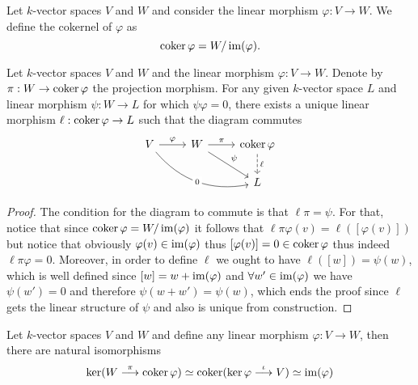 \begin{definition}[Cokernel]
    Let \(k\)-vector spaces \(V\) and \(W\) and consider the linear morphism
    \(\varphi : V \to W\). We define the cokernel of \(\varphi\) as
    \[
        \operatorname{coker} \varphi = W/\operatorname{im}(\varphi).
    \]
\end{definition}

\begin{theorem}
    Let \(k\)-vector spaces \(V\) and \(W\) and the linear morphism \(\varphi : V
    \to W\). Denote by \(\pi : W \to \operatorname{coker} \varphi\) the projection morphism.
    For any given \(k\)-vector space \(L\) and linear morphism \(\psi : W \to L\)
    for which \(\psi  \varphi = 0\), there exists a unique linear
    morphism \(\ell : \operatorname{coker} \varphi \to L\) such that the diagram commutes
    \[
        \begin{tikzcd}
            V \ar[drr, bend right, "0" description] \ar[r, "\varphi"] &W \ar[r,
                "\pi"] \ar[dr, "\psi"] &\coker \varphi \ar[d, dashed, "\ell"]
            \\
            & &L
        \end{tikzcd}
    \]
\end{theorem}

\begin{proof}
    The condition for the diagram to commute is that \(\ell  \pi = \psi\).
    For that, notice that since \(\operatorname{coker} \varphi = W/\operatorname{im}(\varphi)\) it follows
    that \(\ell  \pi  \varphi (v) = \ell([\varphi(v)])\) but notice that
    obviously \(\varphi(v) \in \operatorname{im}(\varphi)\) thus \([\varphi(v)] = 0 \in \operatorname{coker}
    \varphi\) thus indeed \(\ell  \pi  \varphi = 0\). Moreover, in order
    to define \(\ell\) we ought to have \(\ell([w]) = \psi(w)\), which is well
    defined since \([w] = w + \operatorname{im}(\varphi)\) and \(\forall w' \in \operatorname{im}(\varphi)\)
    we have \(\psi(w') = 0\) and therefore \(\psi(w + w') = \psi(w)\), which ends
    the proof since \(\ell\) gets the linear structure of \(\psi\) and also is
    unique from construction.
\end{proof}

\begin{proposition}
    Let \(k\)-vector spaces \(V\) and \(W\) and define any linear morphism
    \(\varphi : V \to W\), then there are natural isomorphisms
    \[
        \ker(W \overset \pi \longrightarrow \operatorname{coker} \varphi) \simeq \operatorname{coker}(\ker \varphi
        \overset \iota \longrightarrow V) \simeq \operatorname{im}(\varphi)
    \]
\end{proposition}

